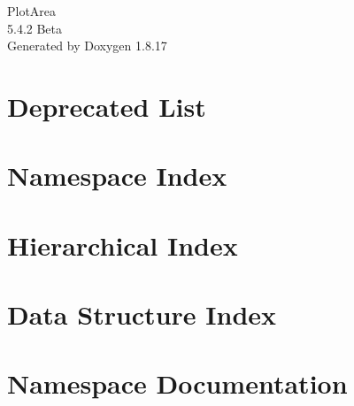 \let\mypdfximage\pdfximage\def\pdfximage{\immediate\mypdfximage}\documentclass[twoside]{book}
\newcommand{\+}{\discretionary{\mbox{\scriptsize$\hookleftarrow$}}{}{}}
\newcommand{\clearemptydoublepage}{%
  \newpage{\pagestyle{empty}\cleardoublepage}%
}
\begin{document}
\hypersetup{pageanchor=false,
             bookmarksnumbered=true,
             pdfencoding=unicode
            }
\begin{titlepage}
\vspace*{7cm}
\begin{center}%
{\Large Plot\+Area \\[1ex]\large 5.\+4.\+2 Beta }\\
\vspace*{1cm}
{\large Generated by Doxygen 1.8.17}\\
\end{center}
\end{titlepage}
\clearemptydoublepage
{}
\tableofcontents
\clearemptydoublepage
{}
\hypersetup{pageanchor=true}

\chapter{Deprecated List}
\label{deprecated}

\chapter{Namespace Index}

\chapter{Hierarchical Index}

\chapter{Data Structure Index}

\chapter{Namespace Documentation}



\end{document}
